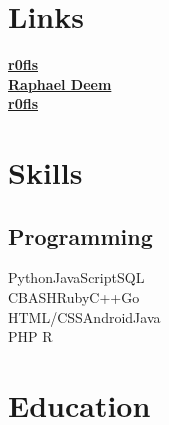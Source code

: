 \documentclass[]{deemweaver}
\begin{document}
%
%
\lastupdated

%
%


%
%

\begin{minipage}[t]{0.33\textwidth}


\section{Links}
{\FA \faGithub} \href{https://github.com/r0fls}{\bf r0fls} \\
{\FA \faLinkedin} \href{https://www.linkedin.com/in/raphael-deem-5757ba31}{\bf Raphael Deem} \\
{\FA \faStackOverflow}  \href{http://stackoverflow.com/users/1318734/rofls}{\bf r0fls} \\


\section{Skills}
\subsection{Programming}
Python\textbullet{}JavaScript\textbullet{}SQL\\
C\textbullet{}BASH\textbullet{}Ruby\textbullet{}C++\textbullet{}Go\\
HTML/CSS\textbullet{}Android\textbullet{}Java\\
PHP \textbullet{}R\\
\sectionsep



\section{Education}


\end{minipage}
\end{document}
